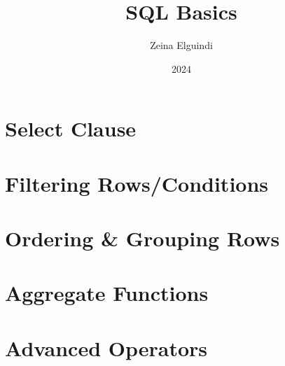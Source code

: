 \documentclass[titlepage]{article}
\title{SQL Basics}
\author{Zeina Elguindi}
\date{2024}
\begin{document}
\maketitle


\tableofcontents

\newpage
\section{Select Clause}


\newpage
\section{Filtering Rows/Conditions}


\newpage
\section{Ordering & Grouping Rows}


\newpage
\section{Aggregate Functions}


\newpage
\section{Advanced Operators}

\end{document}
